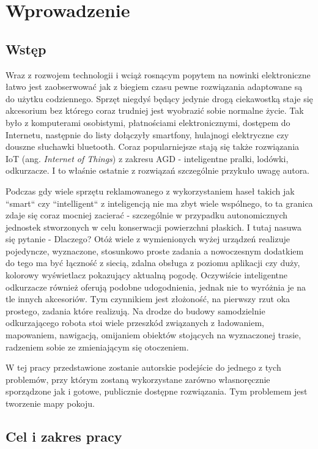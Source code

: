 \chapter{Wprowadzenie}
\section{Wstęp}


Wraz z rozwojem technologii i wciąż rosnącym popytem na nowinki elektroniczne łatwo jest zaobserwować jak z biegiem czasu pewne rozwiązania adaptowane są do użytku codziennego. Sprzęt niegdyś będący jedynie drogą ciekawostką staje się akcesorium bez którego coraz trudniej jest wyobrazić sobie normalne życie. Tak było z komputerami osobistymi, płatnościami elektronicznymi, dostępem do Internetu, następnie do listy dołączyły smartfony, hulajnogi elektryczne czy douszne słuchawki bluetooth. Coraz popularniejsze stają się także rozwiązania IoT (ang. \emph{Internet of Things}) z zakresu AGD - inteligentne pralki, lodówki, odkurzacze. I to właśnie ostatnie z rozwiązań szczególnie przykuło uwagę autora. 

Podczas gdy wiele sprzętu reklamowanego z wykorzystaniem haseł takich jak ``smart`` czy ``intelligent`` z inteligencją nie ma zbyt wiele wspólnego, to ta granica zdaje się coraz mocniej zacierać - szczególnie w przypadku autonomicznych jednostek stworzonych w celu konserwacji powierzchni płaskich. I tutaj nasuwa się pytanie - Dlaczego? Otóż wiele z wymienionych wyżej urządzeń realizuje pojedyncze, wyznaczone, stosunkowo proste zadania a nowoczesnym dodatkiem do tego ma być łączność z siecią, zdalna obsługa z poziomu aplikacji czy duży, kolorowy wyświetlacz pokazujący aktualną pogodę. Oczywiście inteligentne odkurzacze również oferują podobne udogodnienia, jednak nie to wyróżnia je na tle innych akcesoriów. Tym czynnikiem jest złożoność, na pierwszy rzut oka prostego, zadania które realizują. Na drodze do budowy samodzielnie odkurzającego robota stoi wiele przeszkód związanych z ładowaniem, mapowaniem, nawigacją, omijaniem obiektów stojących na wyznaczonej trasie, radzeniem sobie ze zmieniającym się otoczeniem.

W tej pracy przedstawione zostanie autorskie podejście do jednego z tych problemów, przy którym zostaną wykorzystane zarówno własnoręcznie sporządzone jak i gotowe, publicznie dostępne rozwiązania. Tym problemem jest tworzenie mapy pokoju.

\section{Cel i zakres pracy}
